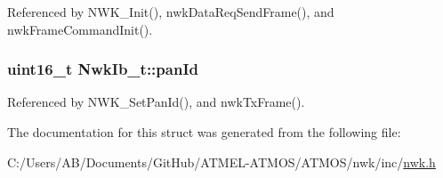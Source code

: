 Referenced by N\-W\-K\-\_\-\-Init(), nwk\-Data\-Req\-Send\-Frame(), and nwk\-Frame\-Command\-Init().

\hypertarget{struct_nwk_ib__t_a421fbf7eaa40857b90ed458d8648e774}{
\subsubsection[{pan\-Id}]{\setlength{\rightskip}{0pt plus 5cm}uint16\-\_\-t Nwk\-Ib\-\_\-t\-::pan\-Id}}\label{struct_nwk_ib__t_a421fbf7eaa40857b90ed458d8648e774}


Referenced by N\-W\-K\-\_\-\-Set\-Pan\-Id(), and nwk\-Tx\-Frame().



The documentation for this struct was generated from the following file\-:\begin{DoxyCompactItemize}
\item 
C\-:/\-Users/\-A\-B/\-Documents/\-Git\-Hub/\-A\-T\-M\-E\-L-\/\-A\-T\-M\-O\-S/\-A\-T\-M\-O\-S/nwk/inc/\hyperlink{nwk_8h}{nwk.\-h}\end{DoxyCompactItemize}
